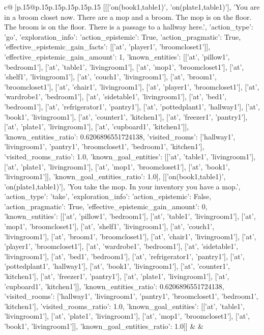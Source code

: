 \documentclass{article}
\begin{document}
{\begin{supertabular}{c@{$\;$}|p{.15\linewidth}@{}p{.15\linewidth}p{.15\linewidth}p{.15\linewidth}p{.15\linewidth}p{.15\linewidth}}
{{{	 [[['on(book1,table1)', 'on(plate1,table1)'], 'You are in a broom closet now. There are a mop and a broom. The mop is on the floor. The broom is on the floor. There is a passage to a hallway here.', {'action_type': 'go', 'exploration_info': {'action_epistemic': True, 'action_pragmatic': True, 'effective_epistemic_gain_facts': [['at', 'player1', 'broomcloset1']], 'effective_epistemic_gain_amount': 1, 'known_entities': [['at', 'pillow1', 'bedroom1'], ['at', 'table1', 'livingroom1'], ['at', 'mop1', 'broomcloset1'], ['at', 'shelf1', 'livingroom1'], ['at', 'couch1', 'livingroom1'], ['at', 'broom1', 'broomcloset1'], ['at', 'chair1', 'livingroom1'], ['at', 'player1', 'broomcloset1'], ['at', 'wardrobe1', 'bedroom1'], ['at', 'sidetable1', 'livingroom1'], ['at', 'bed1', 'bedroom1'], ['at', 'refrigerator1', 'pantry1'], ['at', 'pottedplant1', 'hallway1'], ['at', 'book1', 'livingroom1'], ['at', 'counter1', 'kitchen1'], ['at', 'freezer1', 'pantry1'], ['at', 'plate1', 'livingroom1'], ['at', 'cupboard1', 'kitchen1']], 'known_entities_ratio': 0.6206896551724138, 'visited_rooms': ['hallway1', 'livingroom1', 'pantry1', 'broomcloset1', 'bedroom1', 'kitchen1'], 'visited_rooms_ratio': 1.0, 'known_goal_entities': [['at', 'table1', 'livingroom1'], ['at', 'plate1', 'livingroom1'], ['at', 'mop1', 'broomcloset1'], ['at', 'book1', 'livingroom1']], 'known_goal_entities_ratio': 1.0}}], [['on(book1,table1)', 'on(plate1,table1)'], 'You take the mop. In your inventory you have a mop.', {'action_type': 'take', 'exploration_info': {'action_epistemic': False, 'action_pragmatic': True, 'effective_epistemic_gain_amount': 0, 'known_entities': [['at', 'pillow1', 'bedroom1'], ['at', 'table1', 'livingroom1'], ['at', 'mop1', 'broomcloset1'], ['at', 'shelf1', 'livingroom1'], ['at', 'couch1', 'livingroom1'], ['at', 'broom1', 'broomcloset1'], ['at', 'chair1', 'livingroom1'], ['at', 'player1', 'broomcloset1'], ['at', 'wardrobe1', 'bedroom1'], ['at', 'sidetable1', 'livingroom1'], ['at', 'bed1', 'bedroom1'], ['at', 'refrigerator1', 'pantry1'], ['at', 'pottedplant1', 'hallway1'], ['at', 'book1', 'livingroom1'], ['at', 'counter1', 'kitchen1'], ['at', 'freezer1', 'pantry1'], ['at', 'plate1', 'livingroom1'], ['at', 'cupboard1', 'kitchen1']], 'known_entities_ratio': 0.6206896551724138, 'visited_rooms': ['hallway1', 'livingroom1', 'pantry1', 'broomcloset1', 'bedroom1', 'kitchen1'], 'visited_rooms_ratio': 1.0, 'known_goal_entities': [['at', 'table1', 'livingroom1'], ['at', 'plate1', 'livingroom1'], ['at', 'mop1', 'broomcloset1'], ['at', 'book1', 'livingroom1']], 'known_goal_entities_ratio': 1.0}}]] 
	  } 
	   } 
	   } 
	 & & \\ 
 


\end{supertabular}}
\end{document}
